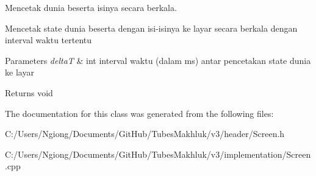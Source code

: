 Mencetak dunia beserta isinya secara berkala. 

Mencetak state dunia beserta dengan isi-\/isinya ke layar secara berkala dengan interval waktu tertentu 
\begin{DoxyParams}{Parameters}
{\em deltaT} & int interval waktu (dalam ms) antar pencetakan state dunia ke layar \\
\hline
\end{DoxyParams}
\begin{DoxyReturn}{Returns}
void 
\end{DoxyReturn}


The documentation for this class was generated from the following files\+:\begin{DoxyCompactItemize}
\item 
C\+:/\+Users/\+Ngiong/\+Documents/\+Git\+Hub/\+Tubes\+Makhluk/v3/header/Screen.\+h\item 
C\+:/\+Users/\+Ngiong/\+Documents/\+Git\+Hub/\+Tubes\+Makhluk/v3/implementation/Screen.\+cpp\end{DoxyCompactItemize}
